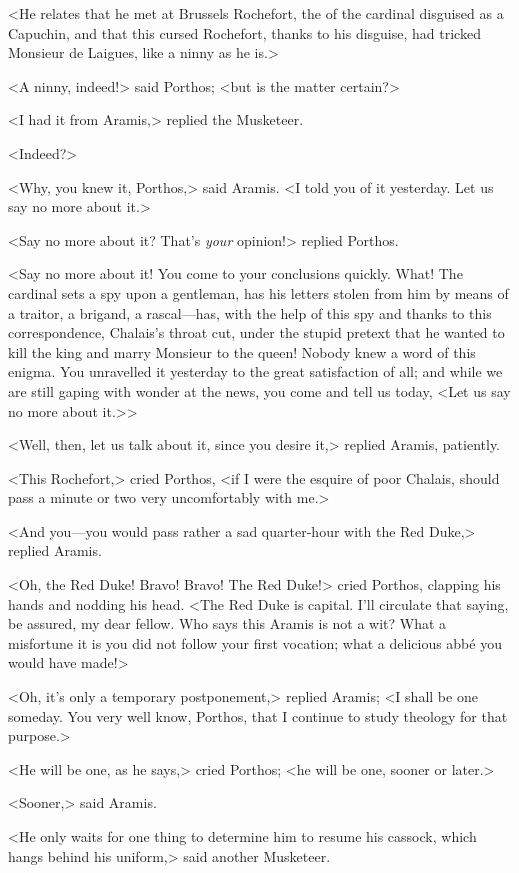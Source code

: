 <He relates that he met at Brussels Rochefort, the  of the cardinal disguised as a Capuchin, and that this cursed Rochefort, thanks to his disguise, had tricked Monsieur de Laigues, like a ninny as he is.> 

<A ninny, indeed!> said Porthos; <but is the matter certain?> 

<I had it from Aramis,> replied the Musketeer. 

<Indeed?> 

<Why, you knew it, Porthos,> said Aramis. <I told you of it yesterday. Let us say no more about it.> 

<Say no more about it? That's \emph{your} opinion!> replied Porthos. 

<Say no more about it!  You come to your conclusions quickly. What! The cardinal sets a spy upon a gentleman, has his letters stolen from him by means of a traitor, a brigand, a rascal—has, with the help of this spy and thanks to this correspondence, Chalais's throat cut, under the stupid pretext that he wanted to kill the king and marry Monsieur to the queen! Nobody knew a word of this enigma. You unravelled it yesterday to the great satisfaction of all; and while we are still gaping with wonder at the news, you come and tell us today, <Let us say no more about it.>>

<Well, then, let us talk about it, since you desire it,> replied Aramis, patiently. 

<This Rochefort,> cried Porthos, <if I were the esquire of poor Chalais, should pass a minute or two very uncomfortably with me.> 

<And you—you would pass rather a sad quarter-hour with the Red Duke,> replied Aramis. 

<Oh, the Red Duke! Bravo! Bravo! The Red Duke!> cried Porthos, clapping his hands and nodding his head. <The Red Duke is capital. I'll circulate that saying, be assured, my dear fellow. Who says this Aramis is not a wit? What a misfortune it is you did not follow your first vocation; what a delicious abbé you would have made!> 

<Oh, it's only a temporary postponement,> replied Aramis; <I shall be one someday. You very well know, Porthos, that I continue to study theology for that purpose.> 

<He will be one, as he says,> cried Porthos; <he will be one, sooner or later.> 

<Sooner,> said Aramis. 

<He only waits for one thing to determine him to resume his cassock, which hangs behind his uniform,> said another Musketeer. 

